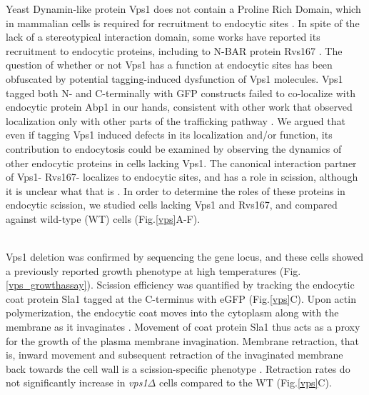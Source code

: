 \documentclass[9pt,lineno]{elife}
\begin{document}
Yeast Dynamin-like protein Vps1 does not contain a Proline Rich Domain, which in mammalian cells is required for recruitment to endocytic sites \citep{Grabs1997,Cestra1999,Farsad2001,Meinecke2013b}. In spite of the lack of a stereotypical interaction domain, some works have reported its recruitment to endocytic proteins, including to N-BAR protein Rvs167 \citep{Yu2004,Nannapaneni2010b,Rooij2010}. The question of whether or not Vps1 has a function at endocytic sites has been obfuscated by potential tagging-induced dysfunction of Vps1 molecules. Vps1 tagged both N- and C-terminally with GFP constructs failed to co-localize with endocytic protein Abp1 in our hands, consistent with other work that observed localization only with other parts of the trafficking pathway \citep{GoudGadila2017}. We argued that even if tagging Vps1 induced defects in its localization and/or function, its contribution to endocytosis could be examined by observing the dynamics of other endocytic proteins in cells lacking Vps1. The canonical interaction partner of Vps1- Rvs167- localizes to endocytic sites, and has a role in scission, although it is unclear what that is \citep{Kukulski2012,Picco2015}. In order to determine the roles of these proteins in endocytic scission, we studied cells lacking Vps1 and Rvs167, and compared against wild-type (WT) cells (Fig.\ref{vps}A-F).

~\\
Vps1 deletion was confirmed by sequencing the gene locus, and these cells showed a previously reported \citep{Rothman1986}  growth phenotype at high temperatures (Fig.\ref{vps_growthassay}). Scission efficiency was quantified by tracking the endocytic coat protein Sla1 tagged at the C-terminus with eGFP (Fig.\ref{vps}C). Upon actin polymerization, the endocytic coat moves into the cytoplasm along with the membrane as it invaginates \citep{Skruzny2012}. Movement of coat protein Sla1 thus acts as a proxy for the growth of the plasma membrane invagination. Membrane retraction, that is, inward movement and subsequent retraction of the invaginated membrane back towards the cell wall is a scission-specific phenotype \citep{Kaksonen2005}. Retraction rates do not significantly increase in  \textit{vps1$\Delta$} cells compared to the WT (Fig.\ref{vps}C).
\end{document}
